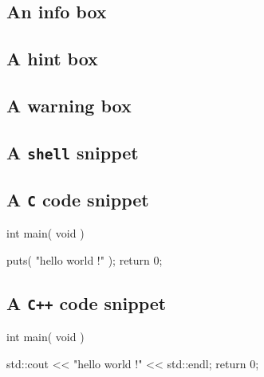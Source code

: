 \documentclass{42-en}
\begin{document}
        \newpage


        \subsection{An info box}



        \subsection{A hint box}



        \subsection{A warning box}



        \newpage


        \subsection{A \texttt{shell} snippet}




        \subsection{A \texttt{C} code snippet}

           \begin{42ccode}
int main( void ) {

    puts( "hello world !" );
    return 0;
}
\end{42ccode}


        \subsection{A \texttt{C++} code snippet}

            \begin{42cppcode}
int main( void ) {

    std::cout << "hello world !" << std::endl;
    return 0;
}
\end{42cppcode}
\end{document}
